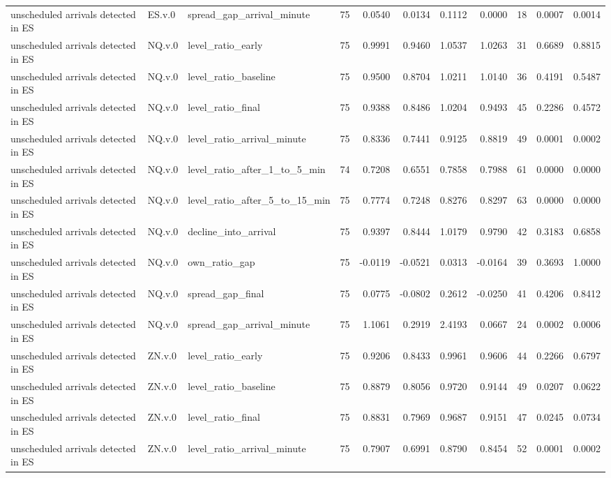 \begin{tabular}{lllrrrrrrrr}
unscheduled arrivals detected in ES & ES.v.0 & spread_gap_arrival_minute & 75 & 0.0540 & 0.0134 & 0.1112 & 0.0000 & 18 & 0.0007 & 0.0014 \\
unscheduled arrivals detected in ES & NQ.v.0 & level_ratio_early & 75 & 0.9991 & 0.9460 & 1.0537 & 1.0263 & 31 & 0.6689 & 0.8815 \\
unscheduled arrivals detected in ES & NQ.v.0 & level_ratio_baseline & 75 & 0.9500 & 0.8704 & 1.0211 & 1.0140 & 36 & 0.4191 & 0.5487 \\
unscheduled arrivals detected in ES & NQ.v.0 & level_ratio_final & 75 & 0.9388 & 0.8486 & 1.0204 & 0.9493 & 45 & 0.2286 & 0.4572 \\
unscheduled arrivals detected in ES & NQ.v.0 & level_ratio_arrival_minute & 75 & 0.8336 & 0.7441 & 0.9125 & 0.8819 & 49 & 0.0001 & 0.0002 \\
unscheduled arrivals detected in ES & NQ.v.0 & level_ratio_after_1_to_5_min & 74 & 0.7208 & 0.6551 & 0.7858 & 0.7988 & 61 & 0.0000 & 0.0000 \\
unscheduled arrivals detected in ES & NQ.v.0 & level_ratio_after_5_to_15_min & 75 & 0.7774 & 0.7248 & 0.8276 & 0.8297 & 63 & 0.0000 & 0.0000 \\
unscheduled arrivals detected in ES & NQ.v.0 & decline_into_arrival & 75 & 0.9397 & 0.8444 & 1.0179 & 0.9790 & 42 & 0.3183 & 0.6858 \\
unscheduled arrivals detected in ES & NQ.v.0 & own_ratio_gap & 75 & -0.0119 & -0.0521 & 0.0313 & -0.0164 & 39 & 0.3693 & 1.0000 \\
unscheduled arrivals detected in ES & NQ.v.0 & spread_gap_final & 75 & 0.0775 & -0.0802 & 0.2612 & -0.0250 & 41 & 0.4206 & 0.8412 \\
unscheduled arrivals detected in ES & NQ.v.0 & spread_gap_arrival_minute & 75 & 1.1061 & 0.2919 & 2.4193 & 0.0667 & 24 & 0.0002 & 0.0006 \\
unscheduled arrivals detected in ES & ZN.v.0 & level_ratio_early & 75 & 0.9206 & 0.8433 & 0.9961 & 0.9606 & 44 & 0.2266 & 0.6797 \\
unscheduled arrivals detected in ES & ZN.v.0 & level_ratio_baseline & 75 & 0.8879 & 0.8056 & 0.9720 & 0.9144 & 49 & 0.0207 & 0.0622 \\
unscheduled arrivals detected in ES & ZN.v.0 & level_ratio_final & 75 & 0.8831 & 0.7969 & 0.9687 & 0.9151 & 47 & 0.0245 & 0.0734 \\
unscheduled arrivals detected in ES & ZN.v.0 & level_ratio_arrival_minute & 75 & 0.7907 & 0.6991 & 0.8790 & 0.8454 & 52 & 0.0001 & 0.0002 \\

\end{tabular}
